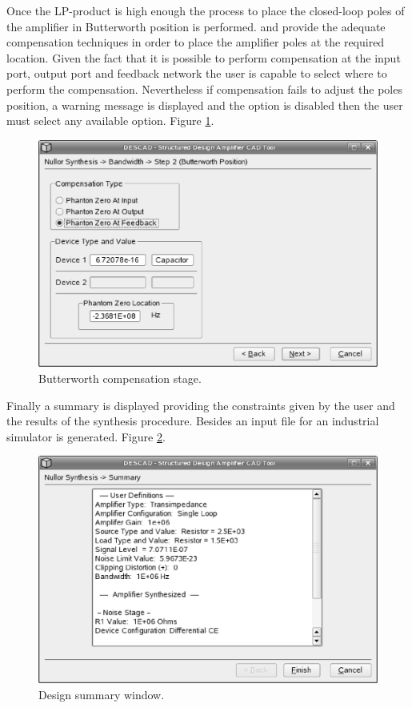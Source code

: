 \documentclass[twocolumn]{IEEEtran}
\begin{document}
Once the LP-product is high enough the process to place the closed-loop poles of the amplifier in Butterworth position is performed. \cite{verhoeven} and \cite{nordholt} provide the adequate compensation techniques in order to place the amplifier poles at the required location. Given the fact that it is possible to perform compensation at the input port, output port and feedback network the user is capable to select where to perform the compensation. Nevertheless if compensation fails to adjust the poles position, a warning message is displayed and the option is disabled then the user must select any available option. Figure \ref{fig:descad6}.

\begin{figure}[hbtp]
	\centering
	\includegraphics[scale=0.3]{figures/wizard6.eps}
	\caption{Butterworth compensation stage.}
	\label{fig:descad6}
\end{figure}

Finally a summary is displayed providing the constraints given by the user and the results of the synthesis procedure. Besides an input file for an industrial simulator is generated. Figure \ref{fig:descad7}.

\begin{figure}[hbtp]
	\centering
	\includegraphics[scale=0.3]{figures/wizard8.eps}
	\caption{Design summary window.}
	\label{fig:descad7}
\end{figure}
\end{document}
